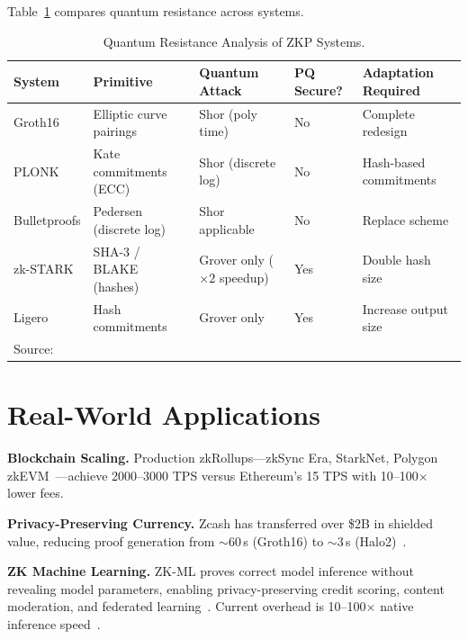 \documentclass[sigconf,nonacm]{acmart}
\begin{document}
Table~\ref{tab:quantum_resistance} compares quantum resistance across systems.

\begin{table}[t]
\caption{Quantum Resistance Analysis of ZKP Systems.}
\label{tab:quantum_resistance}
\small
\setlength{\tabcolsep}{5pt}
\begin{tabularx}{\textwidth}{@{}p{2.3cm}p{3.0cm}p{3.0cm}p{2.2cm}X@{}}
\toprule
\textbf{System} & \textbf{Primitive} & \textbf{Quantum Attack} &
\textbf{PQ Secure?} & \textbf{Adaptation Required} \\
\midrule
Groth16  & Elliptic curve pairings & Shor (poly time) & No & Complete redesign \\
PLONK    & Kate commitments (ECC) & Shor (discrete log) & No & Hash-based commitments \\
Bulletproofs & Pedersen (discrete log) & Shor applicable & No & Replace scheme \\
zk-STARK & SHA-3 / BLAKE (hashes) & Grover only ($\times2$ speedup) & Yes & Double hash size \\
Ligero   & Hash commitments & Grover only & Yes & Increase output size \\
\bottomrule
\multicolumn{5}{l}{\footnotesize Source:~\cite{post_quantum_zkp_2023,quantum_cryptanalysis_2024}} \\
\end{tabularx}
\end{table}

\section{Real-World Applications}
\label{sec:applications}

\textbf{Blockchain Scaling.} Production zkRollups---zkSync Era, StarkNet, Polygon
zkEVM~\cite{zksync_2024,starknet_2023,polygon_2024}---achieve 2000--3000 TPS versus
Ethereum's 15 TPS with 10--100$\times$ lower fees.

\textbf{Privacy-Preserving Currency.} Zcash has transferred over
\$2B in shielded value, reducing proof generation from $\sim$60\,s
(Groth16) to $\sim$3\,s (Halo2)~\cite{zcash_2024}.

\textbf{ZK Machine Learning.} ZK-ML proves correct model inference without revealing
model parameters, enabling privacy-preserving credit scoring, content moderation, and
federated learning~\cite{zkml_deployment_2023,private_ml_2024}. Current overhead is
10--100$\times$ native inference speed~\cite{zk_friendly_ml_2024}.
\end{document}

